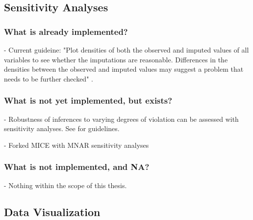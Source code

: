 \documentclass[article]{jss}
\begin{document}


\subsection{Sensitivity Analyses} \label{sec:sensitivity}


\subsubsection{What is already implemented?}

- Current guideine: "Plot densities of both the observed and imputed values of all variables to see whether the imputations are reasonable. Differences in the densities between the observed and imputed values may suggest a problem that needs to be further checked" \cite[p.~43]{mice}. 

\subsubsection{What is not yet implemented, but exists?}

- Robustness of inferences to varying degrees of violation can be assessed with sensitivity analyses. See \citep{nguy17} for guidelines. 

- Forked MICE with MNAR sensitivity analyses

\subsubsection{What is not implemented, and NA?}

- Nothing within the scope of this thesis.


\subsection{Data Visualization} \label{sec:visualization}
\end{document}
